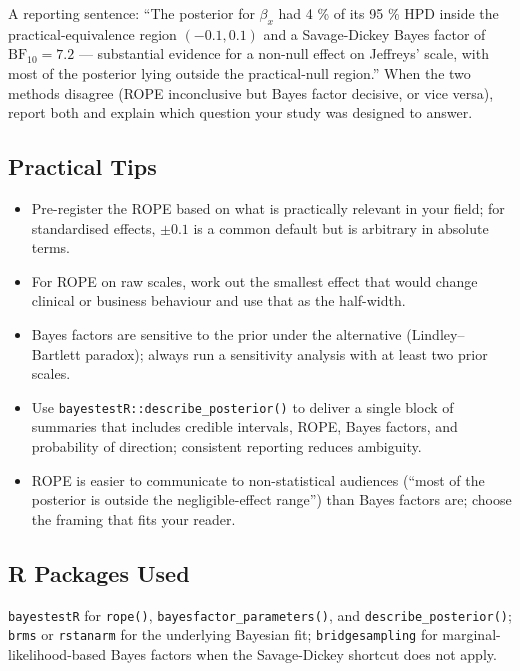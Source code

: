 \documentclass[
]{article}
\providecommand{\tightlist}{%
  \setlength{\itemsep}{0pt}\setlength{\parskip}{0pt}}
\begin{document}
A reporting sentence: ``The posterior for \(\beta_x\) had 4 \% of its 95
\% HPD inside the practical-equivalence region \((-0.1, 0.1)\) and a
Savage-Dickey Bayes factor of \(\mathrm{BF}_{10} = 7.2\) --- substantial
evidence for a non-null effect on Jeffreys' scale, with most of the
posterior lying outside the practical-null region.'' When the two
methods disagree (ROPE inconclusive but Bayes factor decisive, or vice
versa), report both and explain which question your study was designed
to answer.

\subsection{Practical Tips}\label{practical-tips}

\begin{itemize}
\tightlist
\item
  Pre-register the ROPE based on what is practically relevant in your
  field; for standardised effects, \(\pm 0.1\) is a common default but
  is arbitrary in absolute terms.
\item
  For ROPE on raw scales, work out the smallest effect that would change
  clinical or business behaviour and use that as the half-width.
\item
  Bayes factors are sensitive to the prior under the alternative
  (Lindley--Bartlett paradox); always run a sensitivity analysis with at
  least two prior scales.
\item
  Use \texttt{bayestestR::describe\_posterior()} to deliver a single
  block of summaries that includes credible intervals, ROPE, Bayes
  factors, and probability of direction; consistent reporting reduces
  ambiguity.
\item
  ROPE is easier to communicate to non-statistical audiences (``most of
  the posterior is outside the negligible-effect range'') than Bayes
  factors are; choose the framing that fits your reader.
\end{itemize}

\subsection{R Packages Used}\label{r-packages-used}

\texttt{bayestestR} for \texttt{rope()},
\texttt{bayesfactor\_parameters()}, and \texttt{describe\_posterior()};
\texttt{brms} or \texttt{rstanarm} for the underlying Bayesian fit;
\texttt{bridgesampling} for marginal-likelihood-based Bayes factors when
the Savage-Dickey shortcut does not apply.
\end{document}
